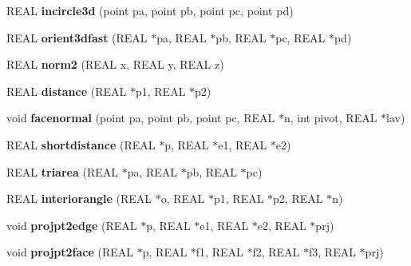 \begin{DoxyCompactItemize}
R\+E\+AL {\bfseries incircle3d} (point pa, point pb, point pc, point pd)
\item 
\mbox{\label{classtetgenmesh_aef205894579ac572d70018a484e81c84}} 
R\+E\+AL {\bfseries orient3dfast} (R\+E\+AL $\ast$pa, R\+E\+AL $\ast$pb, R\+E\+AL $\ast$pc, R\+E\+AL $\ast$pd)
\item 
\mbox{\label{classtetgenmesh_a5465dba34abe5cec04987f0a767c7ca9}} 
R\+E\+AL {\bfseries norm2} (R\+E\+AL x, R\+E\+AL y, R\+E\+AL z)
\item 
\mbox{\label{classtetgenmesh_a4f2849235299c81ad7d585dc0b657d80}} 
R\+E\+AL {\bfseries distance} (R\+E\+AL $\ast$p1, R\+E\+AL $\ast$p2)
\item 
\mbox{\label{classtetgenmesh_adef28f2839ea13688a3ac9a7184d1db8}} 
void {\bfseries facenormal} (point pa, point pb, point pc, R\+E\+AL $\ast$n, int pivot, R\+E\+AL $\ast$lav)
\item 
\mbox{\label{classtetgenmesh_a4038b1e2dd2333374426540d0d4df0d8}} 
R\+E\+AL {\bfseries shortdistance} (R\+E\+AL $\ast$p, R\+E\+AL $\ast$e1, R\+E\+AL $\ast$e2)
\item 
\mbox{\label{classtetgenmesh_aa05bc79cab358be88f26876be920616f}} 
R\+E\+AL {\bfseries triarea} (R\+E\+AL $\ast$pa, R\+E\+AL $\ast$pb, R\+E\+AL $\ast$pc)
\item 
\mbox{\label{classtetgenmesh_a814827be2067d8163a688c7fc017972f}} 
R\+E\+AL {\bfseries interiorangle} (R\+E\+AL $\ast$o, R\+E\+AL $\ast$p1, R\+E\+AL $\ast$p2, R\+E\+AL $\ast$n)
\item 
\mbox{\label{classtetgenmesh_ac22152fa0a43b549ae37cadff0e8c56f}} 
void {\bfseries projpt2edge} (R\+E\+AL $\ast$p, R\+E\+AL $\ast$e1, R\+E\+AL $\ast$e2, R\+E\+AL $\ast$prj)
\item 
\mbox{\label{classtetgenmesh_a298e94262eee21b087476e970d8324e9}} 
void {\bfseries projpt2face} (R\+E\+AL $\ast$p, R\+E\+AL $\ast$f1, R\+E\+AL $\ast$f2, R\+E\+AL $\ast$f3, R\+E\+AL $\ast$prj)
\item 
\mbox{\label{classtetgenmesh_ade71f72201885054e237f5213407001f}} 

\end{DoxyCompactItemize}
